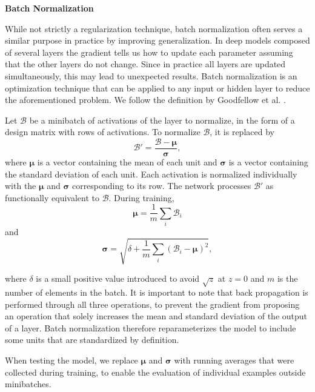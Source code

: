 \textbf{Batch Normalization}

While not strictly a regularization technique, batch normalization \cite{ioffe2015batch} often serves a similar purpose in practice by improving generalization.
In deep models composed of several layers the gradient tells us how to update each parameter assuming that the other layers do not change. Since in practice all layers are updated simultaneously, this may lead to unexpected results. Batch normalization is an optimization technique that can be applied to any input or hidden layer to reduce the aforementioned problem. We follow the definition by Goodfellow et al. \cite{Goodfellow-et-al-2016}.

Let $\mathcal{B}$ be a minibatch of activations of the layer to normalize, in the form of a design matrix with rows of activations. To normalize $\mathcal{B}$, it is replaced by
\begin{equation}
    \mathcal{B}' = \frac{\mathcal{B} - \boldsymbol{\mu}}{\boldsymbol{\sigma}},
\end{equation}
where $\boldsymbol{\mu}$ is a vector containing the mean of each unit and $\boldsymbol{\sigma}$ is a vector containing the standard deviation of each unit. Each activation is normalized individually with the $\boldsymbol{\mu}$ and $\boldsymbol{\sigma}$ corresponding to its row. The network processes $\mathcal{B}'$ as functionally equivalent to $\mathcal{B}$. During training,
\begin{equation}
    \boldsymbol{\mu} = \frac{1}{m}\sum_i \mathcal{B}_i
\end{equation}
and
\begin{equation}
    \boldsymbol{\sigma} = \sqrt{\delta + \frac{1}{m} \sum_i (\mathcal{B}_i - \boldsymbol{\mu})^2},
\end{equation}

where $\delta$ is a small positive value introduced to avoid $\sqrt{z}$ at $z = 0$ and $m$ is the number of elements in the batch. It is important to note that back propagation is performed through all three operations, to prevent the gradient from proposing an operation that solely increases the mean and standard deviation of the output of a layer. Batch normalization therefore reparameterizes the model to include some units that are standardized by definition.

When testing the model, we replace $\boldsymbol{\mu}$ and $\boldsymbol{\sigma}$ with running averages that were collected during training, to enable the evaluation of individual examples outside minibatches.


